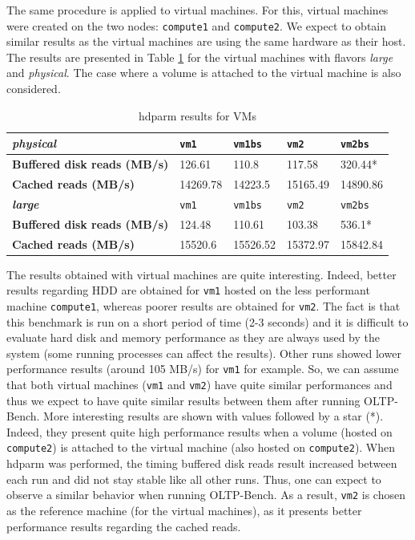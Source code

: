 The same procedure is applied to virtual machines.
For this, virtual machines were created on the two nodes: \texttt{compute1} and \texttt{compute2}.
We expect to obtain similar results as the virtual machines are using the same hardware as their host.
The results are presented in Table \ref{table:hdparm_res_VM} for the virtual machines with flavors \textit{large} and \textit{physical}. The case where a volume is attached to the virtual machine is also considered.

\begin{table}[h]
	\centering
	\begin{tabular}{|m{6.5cm}|m{1.5cm}|m{1.5cm}|m{1.5cm}|m{1.5cm}|}
		\hline
		\textbf{\textit{physical}} & 
		\texttt{vm1} & 
		\texttt{vm1bs} & 
		\texttt{vm2} & 
		\texttt{vm2bs} \\
		\hline
		\textbf{Buffered disk reads (MB/s)} & 
		126.61 & 
		110.8 & 
		117.58 & 
		320.44* \\
		\hline
		\textbf{Cached reads (MB/s)} &  
		14269.78 & 
		14223.5 & 
		15165.49 & 
		14890.86 \\
		\hline\hline
		\textbf{\textit{large}} & 
		\texttt{vm1} & 
		\texttt{vm1bs} & 
		\texttt{vm2} & 
		\texttt{vm2bs} \\
		\hline
		\textbf{Buffered disk reads (MB/s)} & 
		124.48 & 
		110.61 & 
		103.38 & 
		536.1* \\
		\hline
		\textbf{Cached reads (MB/s)} &  
		15520.6 & 
		15526.52 & 
		15372.97 & 
		15842.84 \\
		\hline
	\end{tabular}
	\caption{hdparm results for VMs}
	\label{table:hdparm_res_VM}
\end{table}

The results obtained with virtual machines are quite interesting.
Indeed, better results regarding HDD are obtained for \texttt{vm1} hosted on the less performant machine \texttt{compute1}, whereas poorer results are obtained for \texttt{vm2}.
The fact is that this benchmark is run on a short period of time (2-3 seconds) and 
it is difficult to evaluate hard disk and memory performance as they are always used by the system (some running processes can affect the results). 
Other runs showed lower performance results (around 105 MB/s) for \texttt{vm1} for example.
So, we can assume that both virtual machines (\texttt{vm1} and \texttt{vm2}) have quite similar performances and thus we expect to have quite similar results between them after running OLTP-Bench.
More interesting results are shown with values followed by a star (*). 
Indeed, they present quite high performance results when a volume (hosted on \texttt{compute2}) is attached to the virtual machine (also hosted on \texttt{compute2}).
When hdparm was performed, the timing buffered disk reads result increased between each run and did not stay stable like all other runs.
Thus, one can expect to observe a similar behavior when running OLTP-Bench.
As a result, \texttt{vm2} is chosen as the reference machine (for the virtual machines), as it presents better performance results regarding the cached reads.


